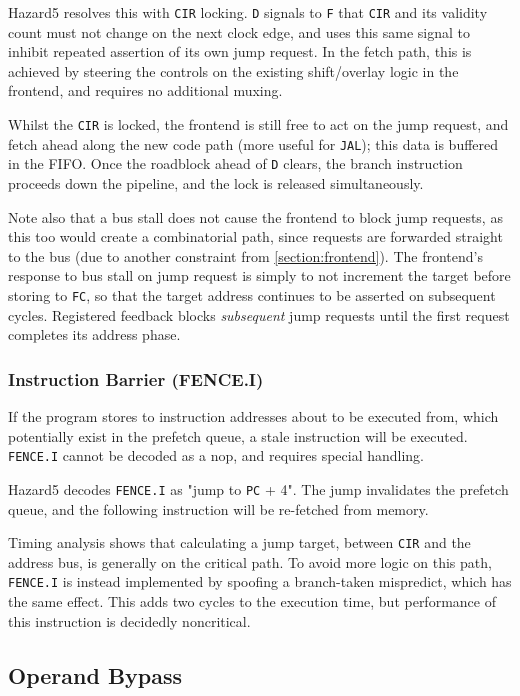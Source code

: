 \documentclass[notitlepage]{article}
\begin{document}
Hazard5 resolves this with \texttt{CIR} locking. \texttt{D} signals to \texttt{F} that \texttt{CIR} and its validity count must not change on the next clock edge, and uses this same signal to inhibit repeated assertion of its own jump request. In the fetch path, this is achieved by steering the controls on the existing shift/overlay logic in the frontend, and requires no additional muxing.

Whilst the \texttt{CIR} is locked, the frontend is still free to act on the jump request, and fetch ahead along the new code path (more useful for \texttt{JAL}); this data is buffered in the FIFO. Once the roadblock ahead of \texttt{D} clears, the branch instruction proceeds down the pipeline, and the lock is released simultaneously.

Note also that a bus stall does not cause the frontend to block jump requests, as this too would create a combinatorial path, since requests are forwarded straight to the bus (due to another constraint from \ref{section:frontend}). The frontend's response to bus stall on jump request is simply to not increment the target before storing to \texttt{FC}, so that the target address continues to be asserted on subsequent cycles. Registered feedback blocks \textit{subsequent} jump requests until the first request completes its address phase.

\subsubsection{Instruction Barrier (FENCE.I)}

If the program stores to instruction addresses about to be executed from, which potentially exist in the prefetch queue, a stale instruction will be executed. \texttt{FENCE.I} cannot be decoded as a nop, and requires special handling.

Hazard5 decodes \texttt{FENCE.I} as "jump to \texttt{PC} + 4". The jump invalidates the prefetch queue, and the following instruction will be re-fetched from memory.

Timing analysis shows that calculating a jump target, between \texttt{CIR} and the address bus, is generally on the critical path. To avoid more logic on this path, \texttt{FENCE.I} is instead implemented by spoofing a branch-taken mispredict, which has the same effect. This adds two cycles to the execution time, but performance of this instruction is decidedly noncritical.

\subsection{Operand Bypass}
\end{document}
